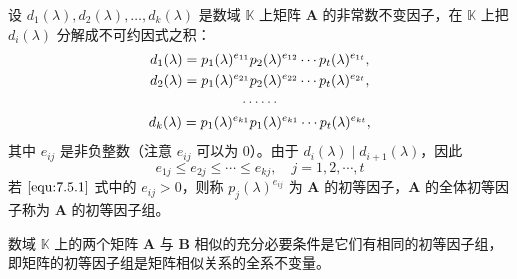 \begin{definition}
    设 $d_{1}(\lambda), d_{2}(\lambda), \ldots, d_{k}(\lambda)$ 是数域 $\mathbb{K}$ 上矩阵 $\bm{A}$ 的非常数不变因子，在 $\mathbb{K}$ 上把 $d_{i}(\lambda)$ 分解成不可约因式之积：
    \begin{gather}
        d_{1}(\lambda) = p_{1}(\lambda)^{e_{11}}p_{2}(\lambda)^{e_{12}}\cdots p_{t}(\lambda)^{e_{1t}},\notag \\
        d_{2}(\lambda) = p_{1}(\lambda)^{e_{21}}p_{2}(\lambda)^{e_{22}}\cdots p_{t}(\lambda)^{e_{2t}},\notag \\
        \cdots \cdots                                                                                        \\
        d_{k}(\lambda) = p_{1}(\lambda)^{e_{k1}}p_{1}(\lambda)^{e_{k1}}\cdots p_{t}(\lambda)^{e_{kt}},\notag
    \end{gather}\label{equ:7.5.1}
    其中 $e_{ij}$ 是非负整数（注意 $e_{ij}$ 可以为 $0$）。由于 $d_{i}(\lambda) \mid d_{i + 1}(\lambda)$，因此
    \[
        e_{1j} \leqslant e_{2j} \leqslant \cdots \leqslant e_{kj},\quad j = 1, 2, \cdots, t
    \]
    若 $\ref{equ:7.5.1}$ 式中的 $e_{ij} > 0$，则称 $p_{j}(\lambda)^{e_{ij}}$ 为 $\bm{A}$ 的初等因子，$\bm{A}$ 的全体初等因子称为 $\bm{A}$ 的初等因子组。
\end{definition}

\begin{theorem}
  数域 $\mathbb{K}$ 上的两个矩阵 $\bm{A}$ 与 $\bm{B}$ 相似的充分必要条件是它们有相同的初等因子组，即矩阵的初等因子组是矩阵相似关系的全系不变量。
\end{theorem}




\section{}







\section{}







\section{}







